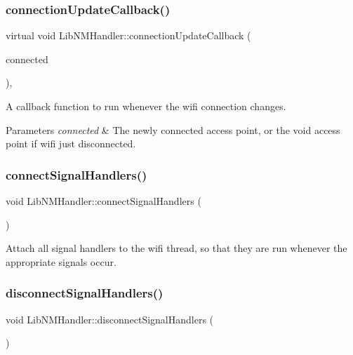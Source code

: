 \subsubsection{\texorpdfstring{connection\+Update\+Callback()}{connectionUpdateCallback()}}
{\footnotesize\ttfamily virtual void Lib\+N\+M\+Handler\+::connection\+Update\+Callback (\begin{DoxyParamCaption}\item[{\mbox{\hyperlink{classWifiAccessPoint_ad18977f884076774803027efbaa131a0}{Wifi\+Access\+Point\+::\+Ptr}}}]{connected }\end{DoxyParamCaption})\hspace{0.3cm}{\ttfamily [protected]}, {}}

A callback function to run whenever the wifi connection changes.


\begin{DoxyParams}{Parameters}
{\em connected} & The newly connected access point, or the void access point if wifi just disconnected. \\
\hline
\end{DoxyParams}
\mbox{\label{classLibNMHandler_a386a6857706ee714e22f2dc677af9b1a}} 
\subsubsection{\texorpdfstring{connect\+Signal\+Handlers()}{connectSignalHandlers()}}
{\footnotesize\ttfamily void Lib\+N\+M\+Handler\+::connect\+Signal\+Handlers (\begin{DoxyParamCaption}{ }\end{DoxyParamCaption})\hspace{0.3cm}{\ttfamily [protected]}}

Attach all signal handlers to the wifi thread, so that they are run whenever the appropriate signals occur. \mbox{\label{classLibNMHandler_ac70dda104a5ef4824c87984e42196c44}} 
\subsubsection{\texorpdfstring{disconnect\+Signal\+Handlers()}{disconnectSignalHandlers()}}
{\footnotesize\ttfamily void Lib\+N\+M\+Handler\+::disconnect\+Signal\+Handlers (\begin{DoxyParamCaption}{ }\end{DoxyParamCaption})\hspace{0.3cm}{\ttfamily [protected]}}

